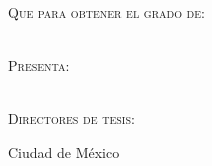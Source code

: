 \begin{adjustbox}{max width=1.2\linewidth, right}
\begin{minipage}[c][0.99\textheight][t]{0.95\textwidth}
            \vspace{60pt}
            {\fontsize{14}{14}\selectfont\textsc{Que para obtener el grado de:\\}}
            \vspace{10pt}
            {\fontsize{14}{14}\selectfont\textbf{\academicdegree\\}}

            \vspace{60pt}
            {\fontsize{14}{14}\selectfont\textsc{Presenta:\\}}
            \vspace{10pt}
            {\fontsize{14}{14}\selectfont\textbf{\authorname\\}}

            \vspace{60pt}
            {\fontsize{14}{14}\selectfont\textsc{Directores de tesis:\\}}
            \vspace{10pt}
            {\fontsize{14}{14}\selectfont\textbf{\thesisdirectors}}

            \vfill
            {\fontsize{12}{12}\selectfont Ciudad de México\\}
            {\fontsize{12}{12}\selectfont \thesisdate\\}
            \vspace{40pt}
        \end{minipage}
    \end{adjustbox}
